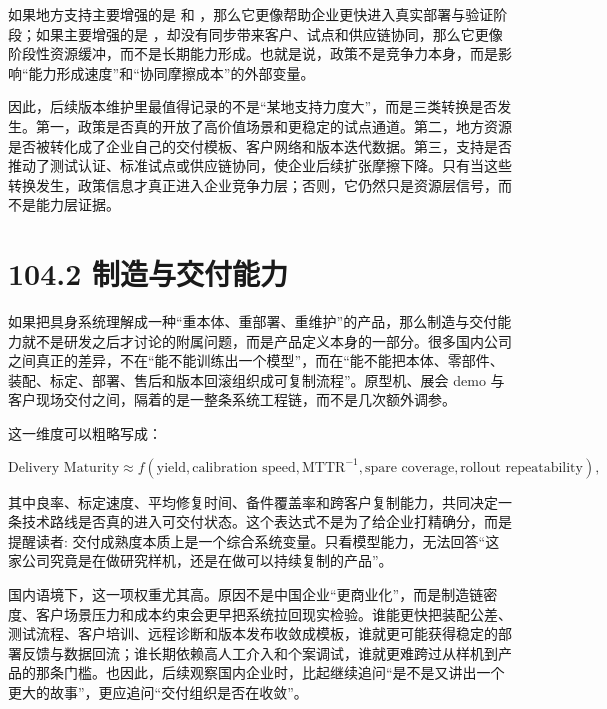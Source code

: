 如果地方支持主要增强的是 \texttt{} 和 \texttt{}，那么它更像帮助企业更快进入真实部署与验证阶段；如果主要增强的是 \texttt{}，却没有同步带来客户、试点和供应链协同，那么它更像阶段性资源缓冲，而不是长期能力形成。也就是说，政策不是竞争力本身，而是影响“能力形成速度”和“协同摩擦成本”的外部变量。

因此，后续版本维护里最值得记录的不是“某地支持力度大”，而是三类转换是否发生。第一，政策是否真的开放了高价值场景和更稳定的试点通道。第二，地方资源是否被转化成了企业自己的交付模板、客户网络和版本迭代数据。第三，支持是否推动了测试认证、标准试点或供应链协同，使企业后续扩张摩擦下降。只有当这些转换发生，政策信息才真正进入企业竞争力层；否则，它仍然只是资源层信号，而不是能力层证据。

\section*{104.2 制造与交付能力}


如果把具身系统理解成一种“重本体、重部署、重维护”的产品，那么制造与交付能力就不是研发之后才讨论的附属问题，而是产品定义本身的一部分。很多国内公司之间真正的差异，不在“能不能训练出一个模型”，而在“能不能把本体、零部件、装配、标定、部署、售后和版本回滚组织成可复制流程”。原型机、展会 demo 与客户现场交付之间，隔着的是一整条系统工程链，而不是几次额外调参。

这一维度可以粗略写成：

\begingroup
\scriptsize
\begin{equation*}
\text{Delivery Maturity} \approx f(\text{yield}, \text{calibration speed}, \text{MTTR}^{-1}, \text{spare coverage}, \text{rollout repeatability}),
\end{equation*}
\endgroup

其中良率、标定速度、平均修复时间、备件覆盖率和跨客户复制能力，共同决定一条技术路线是否真的进入可交付状态。这个表达式不是为了给企业打精确分，而是提醒读者: 交付成熟度本质上是一个综合系统变量。只看模型能力，无法回答“这家公司究竟是在做研究样机，还是在做可以持续复制的产品”。

国内语境下，这一项权重尤其高。原因不是中国企业“更商业化”，而是制造链密度、客户场景压力和成本约束会更早把系统拉回现实检验。谁能更快把装配公差、测试流程、客户培训、远程诊断和版本发布收敛成模板，谁就更可能获得稳定的部署反馈与数据回流；谁长期依赖高人工介入和个案调试，谁就更难跨过从样机到产品的那条门槛。也因此，后续观察国内企业时，比起继续追问“是不是又讲出一个更大的故事”，更应追问“交付组织是否在收敛”。

